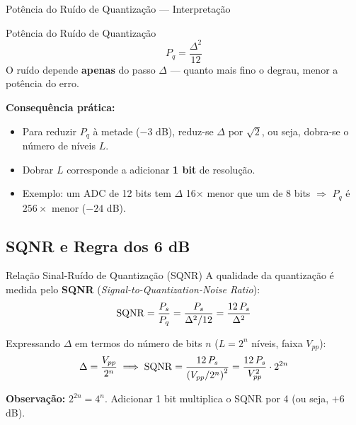 
\begin{frame}{Potência do Ruído de Quantização — Interpretação}
  \begin{block}{Potência do Ruído de Quantização}
    \[
      P_q = \frac{\Delta^2}{12}
    \]
    O ruído depende \textbf{apenas} do passo $\Delta$ — quanto mais fino
    o degrau, menor a potência do erro.
  \end{block}

  \vspace{0.4cm}
  \textbf{Consequência prática:}
  \begin{itemize}
    \item Para reduzir $P_q$ à metade ($-3$ dB), reduz-se $\Delta$ por
          $\sqrt{2}$, ou seja, dobra-se o número de níveis $L$.
    \item Dobrar $L$ corresponde a adicionar \textbf{1 bit} de resolução.
    \item Exemplo: um ADC de 12 bits tem $\Delta$ 16$\times$ menor que um
          de 8 bits $\Rightarrow$ $P_q$ é $256\times$ menor ($-24$ dB).
  \end{itemize}
\end{frame}

\subsection{SQNR e Regra dos 6 dB}

\begin{frame}{Relação Sinal-Ruído de Quantização (SQNR)}
  A qualidade da quantização é medida pelo \textbf{SQNR}
  (\textit{Signal-to-Quantization-Noise Ratio}):
  \[
    \mathrm{SQNR} = \frac{P_s}{P_q}
           = \frac{P_s}{\Delta^2/12}
           = \frac{12\,P_s}{\Delta^2}
  \]

  \vspace{0.3cm}
  Expressando $\Delta$ em termos do número de bits $n$
  ($L = 2^n$ níveis, faixa $V_{pp}$):
  \[
    \Delta = \frac{V_{pp}}{2^n}
    \;\Longrightarrow\;
    \mathrm{SQNR} = \frac{12\,P_s}{\left(V_{pp}/2^n\right)^2}
           = \frac{12\,P_s}{V_{pp}^2}\cdot 2^{2n}
  \]

  \vspace{0.3cm}
  \textbf{Observação:} $2^{2n} = 4^n$.
  Adicionar 1 bit multiplica o SQNR por 4 (ou seja, $+6$ dB).
\end{frame}

